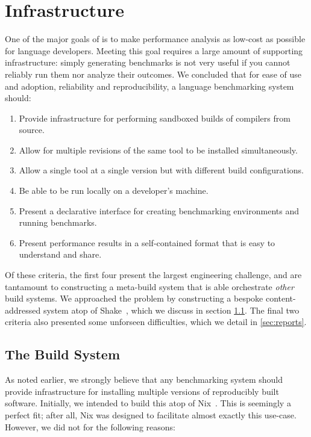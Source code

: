 \documentclass[a4paper,UKenglish,cleveref, autoref, thm-restate,anonymous]{lipics-v2021}
\begin{document}
\section{Infrastructure}
\label{sec:infrastructure}

One of the major goals of \panbench is to make performance analysis as
low-cost as possible for language developers. Meeting this goal requires
a large amount of supporting infrastructure: simply generating benchmarks
is not very useful if you cannot reliably run them nor analyze their outcomes.
We concluded that for ease of use and adoption, reliability and
reproducibility, a language benchmarking system should:

\begin{enumerate}
\item Provide infrastructure for performing sandboxed builds of
  compilers from source.
\item Allow for multiple revisions of the same tool to be installed
  simultaneously.
\item Allow a single tool at a single version but with different build configurations.
\item Be able to be run locally on a developer's machine.
\item Present a declarative interface for creating benchmarking environments and running benchmarks.
\item Present performance results in a self-contained format that is easy to understand
  and share.
\end{enumerate}

Of these criteria, the first four present the largest engineering challenge, and are
tantamount to constructing a meta-build system that is able orchestrate \emph{other} build
systems. We approached the problem by constructing a bespoke content-addressed
system atop of Shake~\cite{Mitchell:2012}, which we discuss in section \ref{sec:builds}.
The final two criteria also presented some unforseen difficulties, which we detail in \ref{sec:reports}.

\subsection{The \panbench Build System}
\label{sec:builds}

As noted earlier, we strongly believe that any benchmarking system should provide infrastructure
for installing multiple versions of reproducibly built software. Initially, we intended to build
this atop of Nix~\cite{Dolstra:Nix}. This is seemingly a perfect fit;
after all, Nix was designed to facilitate almost exactly this use-case. However, we did not
for the following reasons: 
\end{document}
